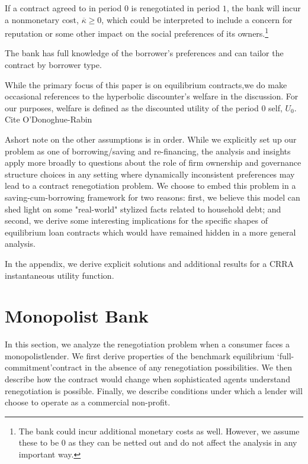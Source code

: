 \documentclass[11pt]{article}%
\providecommand{\DIFdel}[1]{{\protect\color{red} \scriptsize #1}} %
\begin{document}
\DIFdel{If a contract agreed to in period $0$ is renegotiated in period $1$, the
bank will incur a nonmonetary cost, $\overline{\kappa }\geq 0$, which could
be interpreted to include a concern for reputation or some other impact on
the social preferences of its owners.}\footnote{%
\DIFdel{The bank could incur additional monetary costs as well. However, we assume
these to be $0$ as they can be netted out and do not affect the analysis in
any important way.}} %
\addtocounter{footnote}{-1}%
\DIFdel{The bank has full knowledge of the borrower's
preferences and can tailor the contract by borrower type.
}%

\DIFdel{While the primary focus of this paper is on equilibrium contracts,we do make
occasional references to the hyperbolic discounter's welfare in the
discussion. For our purposes, welfare is defined as the discounted utility
of the period $0$ self, $U_{0}$. }%
\DIFdel{Cite O'Donoghue-Rabin}%

\DIFdel{Ashort note on the other assumptions is in order. While we explicitly set
up our problem as one of borrowing/saving and re-financing, the analysis and
insights apply more broadly to questions about the role of firm ownership
and governance structure choices in any setting where dynamically
inconsistent preferences may lead to a contract renegotiation problem. We
choose to embed this problem in a saving-cum-borrowing framework for two
reasons: first, we believe this model can shed light on some "real-world"
stylized facts related to household debt; and second, we derive some
interesting implications for the specific shapes of equilibrium loan
contracts which would have remained hidden in a more general analysis. 
}%

\DIFdel{In the appendix, we derive explicit solutions and additional results for a
CRRA instantaneous utility function.
}%

\section{\DIFdel{Monopolist Bank}}
\addtocounter{section}{-1}%

\DIFdel{In this section, we analyze the renegotiation problem when a consumer faces
a monopolistlender. We first derive properties of the benchmark equilibrium
`full-commitment'contract in the absence of any renegotiation
possibilities. We then describe how the contract would change when
sophisticated agents understand renegotiation is possible. Finally, we
describe conditions under which a lender will choose to operate as a
commercial non-profit.
}%
\end{document}

